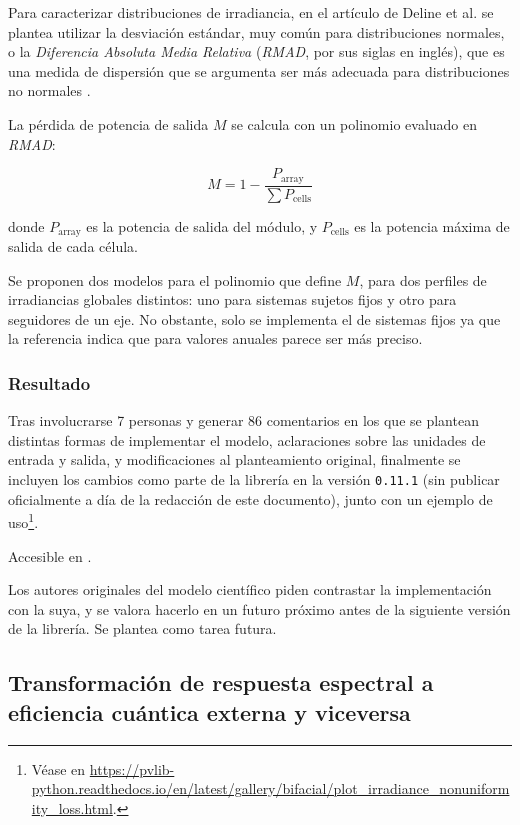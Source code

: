 Para caracterizar distribuciones de irradiancia, en el artículo de Deline et al. \cite{Deline_Ayala_Pelaez_MacAlpine_Olalla_2020} se plantea utilizar la desviación estándar, muy común para distribuciones normales, o la \textit{Diferencia Absoluta Media Relativa} (\textit{RMAD}, por sus siglas en inglés), que es una medida de dispersión que se argumenta ser más adecuada para distribuciones no normales \cite{Ginis_mean_difference_2003}.

La pérdida de potencia de salida $M$ se calcula con un polinomio evaluado en \textit{RMAD}:

\begin{equation} \label{eq:perdidas_heterogeneidad}
    M = 1 - \frac{P_\text{array}}{\sum P_\text{cells}}
\end{equation}

donde $P_\text{array}$ es la potencia de salida del módulo, y $P_\text{cells}$ es la potencia máxima de salida de cada célula.

Se proponen dos modelos para el polinomio que define $M$, para dos perfiles de irradiancias globales distintos: uno para sistemas sujetos fijos y otro para seguidores de un eje. No obstante, solo se implementa el de sistemas fijos ya que la referencia indica que para valores anuales parece ser más preciso.

\subsubsection{Resultado}

Tras involucrarse 7 personas y generar 86 comentarios en los que se plantean distintas formas de implementar el modelo, aclaraciones sobre las unidades de entrada y salida, y modificaciones al planteamiento original, finalmente se incluyen los cambios como parte de la librería en la versión \texttt{0.11.1} (sin publicar oficialmente a día de la redacción de este documento), junto con un ejemplo de uso\footnote{Véase en \url{https://pvlib-python.readthedocs.io/en/latest/gallery/bifacial/plot_irradiance_nonuniformity_loss.html}.}.

Accesible en .

Los autores originales del modelo científico piden contrastar la implementación con la suya, y se valora hacerlo en un futuro próximo antes de la siguiente versión de la librería. Se plantea como tarea futura.

\subsection{Transformación de respuesta espectral a eficiencia cuántica externa y viceversa}


